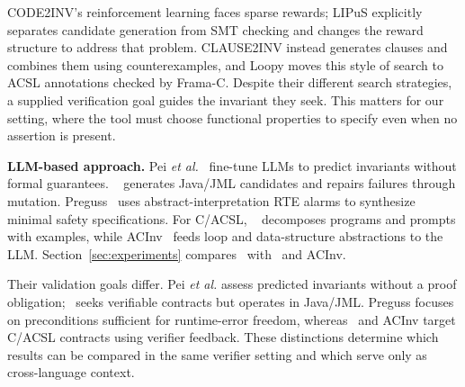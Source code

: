 CODE2INV's reinforcement learning faces sparse rewards; LIPuS explicitly
separates candidate generation from SMT checking and changes the reward
structure to address that problem. CLAUSE2INV instead generates clauses and
combines them using counterexamples, and Loopy moves this style of search to
ACSL annotations checked by Frama-C. Despite their different search
strategies, a supplied verification goal guides the invariant they seek.
This matters for our setting, where the tool must choose functional properties
to specify even when no assertion is present.

\smallskip
\noindent\textbf{LLM-based approach.}
Pei \emph{et al.}~\cite{Can_Large_Language_Models_Reason_About_Program_Invariants} fine-tune LLMs to predict invariants without formal guarantees. \specgen~\cite{SpecGen} generates Java/JML candidates and repairs failures through mutation. Preguss~\cite{Wang2025ATO} uses abstract-interpretation RTE alarms to synthesize minimal safety specifications. For C/ACSL, \autospec~\cite{autospec} decomposes programs and prompts with examples, while ACInv~\cite{Enhancing_Automated_Loop_Invariant_Generation_for_Complex_Programs_with_Large_Language_Models} feeds loop and data-structure abstractions to the LLM. Section~\ref{sec:experiments} compares \toolname\ with \autospec\ and ACInv.

Their validation goals differ. Pei \emph{et al.} assess predicted invariants
without a proof obligation; \specgen\ seeks verifiable contracts but operates
in Java/JML. Preguss focuses on preconditions sufficient for runtime-error
freedom, whereas \autospec\ and ACInv target C/ACSL contracts using verifier
feedback. These distinctions determine which results can be compared in the
same verifier setting and which serve only as cross-language context.


